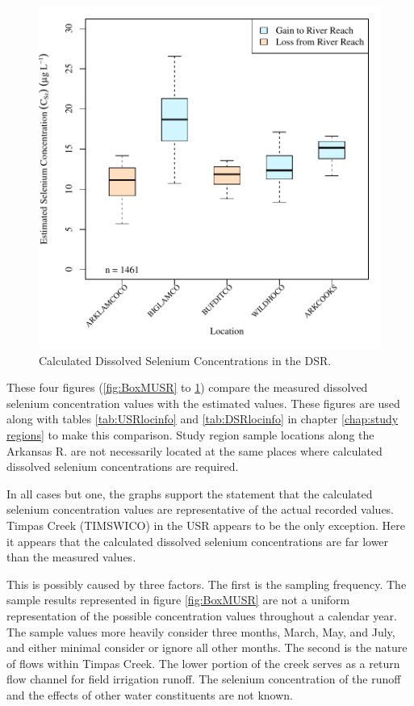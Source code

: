 \begin{linenumbers}
\begin{figure}[htbp]
\centering
	\includegraphics[width=6in]{"Figures/Results_DSR/c BOX Estimated CSe"}
	\caption[Calculated Dissolved Selenium Concentrations in the DSR.]{Calculated Dissolved Selenium Concentrations in the DSR.}
	\label{fig:BoxCDSR}
\end{figure}
These four figures (\ref{fig:BoxMUSR} to \ref{fig:BoxCDSR}) compare the measured dissolved selenium concentration values with the estimated values.  These figures are used along with tables \ref{tab:USRlocinfo} and \ref{tab:DSRlocinfo} in chapter \ref{chap:study regions} to make this comparison.  Study region sample locations along the Arkansas R. are not necessarily located at the same places where calculated dissolved selenium concentrations are required.

In all cases but one, the graphs support the statement that the calculated selenium concentration values are representative of the actual recorded values.  Timpas Creek (TIMSWICO) in the USR appears to be the only exception.  Here it appears that the calculated dissolved selenium concentrations are far lower than the measured values.  

This is possibly caused by three factors.  The first is the sampling frequency.  The sample results represented in figure \ref{fig:BoxMUSR} are not a uniform representation of the possible concentration values throughout a calendar year.  The sample values more heavily consider three months, March, May, and July, and either minimal consider or ignore all other months.  The second is the nature of flows within Timpas Creek.  The lower portion of the creek serves as a return flow channel for field irrigation runoff.  The selenium concentration of the runoff and the effects of other water constituents are not known.  


\end{linenumbers}
